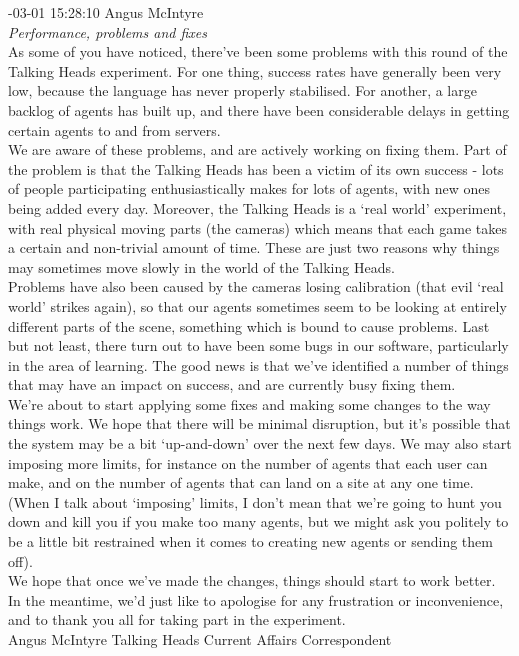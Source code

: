 \begin{mail}
{-03-01 15:28:10 Angus McIntyre}\\
{\itshape Performance, problems and fixes}\\
As some of you have noticed, there've been some problems with this round of the Talking Heads experiment. For one thing, success rates have generally been very low, because the language has never properly stabilised. For another, a large backlog of agents has built up, and there have been considerable delays in getting certain agents to and from servers.\\
We are aware of these problems, and are actively working on fixing them. Part of the problem is that the Talking Heads has been a victim of its own success - lots of people participating enthusiastically makes for lots of agents, with new ones being added every day. Moreover, the Talking Heads is a `real world' experiment, with real physical moving parts (the cameras) which means that each game takes a certain and non-trivial amount of time. These are just two reasons why things may sometimes move slowly in the world of the Talking Heads.\\
Problems have also been caused by the cameras losing calibration (that evil `real world' strikes again), so that our agents sometimes seem to be looking at entirely different parts of the scene, something which is bound to cause problems. Last but not least, there turn out to have been some bugs in our software, particularly in the area of learning. The good news is that we've identified a number of things that may have an impact on success, and are currently busy fixing them.\\
We're about to start applying some fixes and making some changes to the way things work. We hope that there will be minimal disruption, but it's possible that the system may be a bit `up-and-down' over the next few days. We may also start imposing more limits, for instance on the number of agents that each user can make, and on the number of agents that can land on a site at any one time. (When I talk about `imposing' limits, I don't mean that we're going to hunt you down and kill you if you make too many agents, but we might ask you politely to be a little bit restrained when it comes to creating new agents or sending them off). \\
We hope that once we've made the changes, things should start to work better. In the meantime, we'd just like to apologise for any frustration or inconvenience, and to thank you all for taking part in the experiment. \\
  Angus McIntyre
  Talking Heads Current Affairs Correspondent \\


\end{mail}
